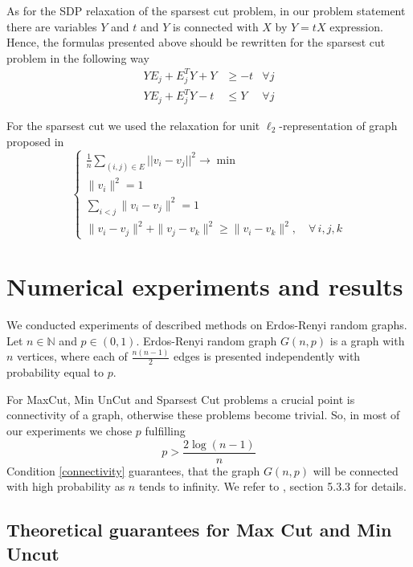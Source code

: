 \documentclass[12pt]{article}
\begin{document}
As for the SDP relaxation of the sparsest cut problem, in our problem statement there 
are variables $Y$ and $t$ and $Y$ is connected with $X$ by $Y = tX$ expression. 
Hence, the formulas presented above should be rewritten for the sparsest cut problem 
in the following way
\begin{align*}
YE_j + E_j^T Y + Y &\geq -t  &\forall j \\
YE_j + E_j^T Y - t &\leq Y  &\forall j
\end{align*}

For the sparsest cut we used the relaxation for unit $\ell_2$-representation of graph 
proposed in \cite{arv}
\begin{equation}
\label{arora}
	\begin{cases}
		\frac1n \sum\limits_{(i, j) \in E} || v_i - v_j ||^2 \longrightarrow \min \\
		\| v_i \|^2 = 1 \\
		\sum\limits_{i < j} \| v_i - v_j \|^2 =1 \\
		\| v_i - v_j \|^2 + \| v_j - v_k \|^2 \geq \| v_i - v_k \|^2, \quad \forall \, i, j, k
	\end{cases}
\end{equation}


\section{Numerical experiments and results}

We conducted experiments of described methods on Erdos-Renyi random graphs.
Let $n \in \mathbb N$ and $p \in (0, 1)$.
Erdos-Renyi random graph $G(n, p)$ is a graph with $n$ vertices, where each of 
$\frac{n(n-1)}2$ edges is presented independently with probability equal to $p$.

For MaxCut, Min UnCut and Sparsest Cut problems a crucial point is connectivity of a 
graph, otherwise these problems become trivial.
So, in most of our experiments we chose $p$ fulfilling
\begin{equation}
\label{connectivity}
	p > \frac{2 \log(n-1)}n
\end{equation}
Condition \ref{connectivity} guarantees, that the graph $G(n, p)$ will be connected with 
high probability as $n$ tends to infinity.
We refer to \cite{tropp}, section 5.3.3 for details.




\subsection{Theoretical guarantees for Max Cut and Min 
Uncut}\label{maxcutbounds}
\end{document}
